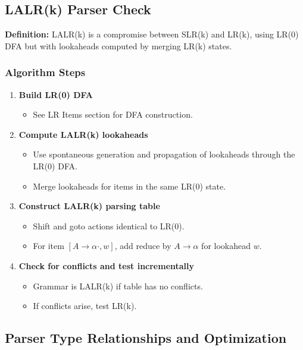 \subsection{LALR(k) Parser Check}

\textbf{Definition:} LALR(k) is a compromise between SLR(k) and LR(k), using LR(0) DFA but with lookaheads computed by merging LR(k) states.

\subsubsection{Algorithm Steps}

\begin{enumerate}
    \item \textbf{Build LR(0) DFA}
    \begin{itemize}
        \item See LR Items section for DFA construction.
    \end{itemize}

    \item \textbf{Compute LALR(k) lookaheads}
    \begin{itemize}
        \item Use spontaneous generation and propagation of lookaheads through the LR(0) DFA.
        \item Merge lookaheads for items in the same LR(0) state.
    \end{itemize}

    \item \textbf{Construct LALR(k) parsing table}
    \begin{itemize}
        \item Shift and goto actions identical to LR(0).
        \item For item \( [A \to \alpha \cdot, w] \), add reduce by \( A \to \alpha \) for lookahead \( w \).
    \end{itemize}

    \item \textbf{Check for conflicts and test incrementally}
    \begin{itemize}
        \item Grammar is LALR(k) if table has no conflicts.
        \item If conflicts arise, test LR(k).
    \end{itemize}
\end{enumerate}

\subsection{Parser Type Relationships and Optimization}

